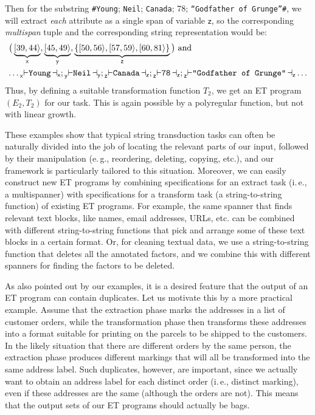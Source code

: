 \documentclass[
a4paper
]{article}
\theoremstyle{plain}
\theoremstyle{definition}
\theoremstyle{remark}
\newcommand{\secondExampleEx}{E_2}
\newcommand{\secondExampleTrans}{T_2}
\DeclareMathOperator{\openmark}{\vdash}
\DeclareMathOperator{\closemark}{\dashv}
\newcommand{\spann}[2]{\ensuremath{[#1,#2\rangle}}
\newcommand{\open}[1]{\prescript{}{#1}{\openmark}}
\newcommand{\close}[1]{\closemark_{#1}}
\newcommand{\varsx}{\ensuremath{\textsf{x}}}
\newcommand{\varsy}{\ensuremath{\textsf{y}}}
\newcommand{\varsz}{\ensuremath{\textsf{z}}}
\begin{document}
Then for the substring
\texttt{\#}\texttt{Young}; \texttt{Neil}; \texttt{Canada}; 78; \texttt{``Godfather of Grunge''}\texttt{\#}, we will extract \emph{each} attribute as a single span of variable $\varsz$, so the corresponding \emph{multispan} tuple and the corresponding string representation would be: 
\begin{align*}
	&\scalebox{1}{$\big(\underbrace{\spann{39}{44}}_{\varsx},\underbrace{\spann{45}{49}}_{\varsy}, \underbrace{\{\spann{50}{56}, \spann{57}{59}, \spann{60}{81}\}}_{\varsz}\big) \text{ and}$}\\
	&\scalebox{1}{$\ldots \open{\varsx} \texttt{Young} \close{\varsx};\open{\varsy}\texttt{Neil}\close{\varsy};\open{\varsz}\texttt{Canada}\close{\varsz}; \open{\varsz}\texttt{78}\close{\varsz};\open{\varsz}\texttt{``Godfather of Grunge''}\close{\varsz}\ldots$}
\end{align*}
Thus, by defining a suitable transformation function $\secondExampleTrans$, we get an ET program $(\secondExampleEx, \secondExampleTrans)$ for our task. This is again possible by a polyregular function, but not with linear growth.

These examples show that typical string transduction tasks can often be naturally divided into the job of locating the relevant parts of our input, followed by their manipulation (e.\,g., reordering, deleting, copying, etc.), and our framework is particularly tailored to this situation. Moreover, we can easily construct new ET programs by combining specifications for an extract task (i.\,e., a multispanner) with specifications for a transform task (a string-to-string function) of existing ET programs. For example, the same spanner that finds relevant text blocks, like names, email addresses, URLs, etc. can be combined with different string-to-string functions that pick and arrange some of these text blocks in a certain format. Or, for cleaning textual data, we use a string-to-string function that deletes all the annotated factors, and we combine this with different spanners for finding the factors to be deleted.  

As also pointed out by our examples, it is a desired feature that the output of an ET program can contain duplicates. Let us motivate this by a more practical example. Assume that the extraction phase marks the addresses in a list of customer orders, while the transformation phase then transforms these addresses into a format suitable for printing on the parcels to be shipped to the customers. In the likely situation that there are different orders by the same person, the extraction phase produces different markings that will all be transformed into the same address label. Such duplicates, however, are important, since we actually want to obtain an address label for each distinct order (i.\,e., distinct marking), even if these addresses are the same (although the orders are not). This means that the output sets of our ET programs should actually be bags.
\end{document}
